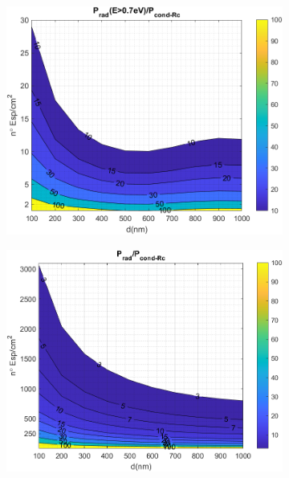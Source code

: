 \begin{figure}[H]
\begin{subfigure}[b]{0.49\textwidth}
		\label{fig:rel_SiSiO2Ge_full}
	\end{subfigure}
	\hfill
	\begin{subfigure}[b]{0.49\textwidth}
		\centering
		\includegraphics[width=1.00\textwidth]{figuras/Resultados/RelacionCondRad/SiGe_Rc.png}
		\caption{ }
		\label{fig:rel_SiSiO2Ge_Rc}
	\end{subfigure}
	\hfill
	\begin{subfigure}[b]{0.49\textwidth}
		\centering
		\includegraphics[width=1.00\textwidth]{figuras/Resultados/RelacionCondRad/SiGe_Rc_full.png}
		\caption{ }
		\label{fig:rel_SiSiO2Ge_Rc_full}
	\end{subfigure}
	\caption{ }
	\label{fig:relation_SiSiO2Ge}
\end{figure}

